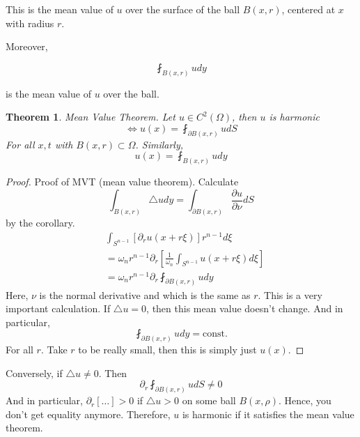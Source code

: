 \documentclass{article}
\newtheorem{theorem}{Theorem}[section]
\newtheorem{one minute paper}[theorem]{One Minute Paper}
\begin{document}
This is the mean value of $u$ over the surface of the ball $B(x,r)$, centered at $x$ with radius $r$. 

Moreover, 

\begin{equation}
    \fint_{B(x,r)}udy 
\end{equation}

is the mean value of $u$ over the ball. 

\begin{theorem}
    Mean Value Theorem. Let $u \in C^{2}(\Omega)$, then $u$ is harmonic 
    \begin{equation}
        \iff u(x) = \fint_{\partial B(x,r)}udS
    \end{equation}
    For all $x,t$ with $B(x,r) \subset \Omega$. Similarly, 
    \begin{equation}
        u(x) = \fint_{B(x,r)}udy
    \end{equation}
\end{theorem}

\begin{proof}
    Proof of MVT (mean value theorem). Calculate
    \begin{equation}
        \int_{B(x,r)}\triangle u dy = \int_{\partial B(x,r)}\frac{\partial u}{\partial \nu}dS
    \end{equation}
    by the corollary. 
    \begin{align*}
        &\int_{S^{n-1}}\left[ \partial_r u(x + r\xi) \right]r^{n-1}d\xi \\
        &= \omega_n r^{n-1}\partial_r\left[ \frac{1}{\omega_n} \int_{S^{n-1}}u(x + r\xi)d\xi\right] \\
        &= \omega_n r^{n-1}\partial_r \fint_{\partial B(x,r)}u dy
    \end{align*}
    Here, $\nu$ is the normal derivative and which is the same as $r$. 
    This is a very important calculation. If $\triangle u =0 $, then this mean value doesn't change. And in particular, 
    \begin{equation}
        \fint_{\partial B(x,r)}u dy = \text{const.}
    \end{equation}
    For all $r$. Take $r$ to be really small, then this is simply just $u(x)$. 
\end{proof}

Conversely, if $\triangle u \neq 0$. Then 
\begin{equation}
    \partial_{r} \fint_{\partial B(x,r)}udS \neq 0
\end{equation}
And in particular, $\partial_r [\dots] > 0$ if $\triangle u > 0$ on some ball $B(x,\rho)$. Hence, you don't get equality anymore. Therefore, $u$ is harmonic if it satisfies the mean value theorem. 
\end{document}
